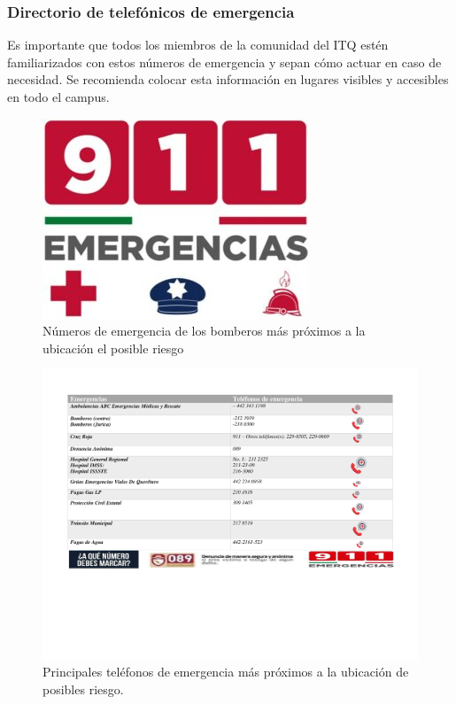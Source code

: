     \subsubsection{Directorio de telefónicos de emergencia}
    Es importante que todos los miembros de la comunidad del ITQ estén familiarizados con estos números de emergencia y sepan cómo actuar en caso de necesidad. Se recomienda colocar esta información en lugares visibles y accesibles en todo el campus.
    \begin{figure}[H]
        \centering
        \includegraphics[scale=0.70]{1/img/Emergencias.jpg}
        \caption{Números de emergencia de los bomberos más próximos a la ubicación el posible riesgo}
        \label{fig:Emergencias}
    \end{figure}
    \begin{figure}[H]
        \centering
        \includegraphics[trim = {20mm 20mm 10mm 10mm},clip,scale=0.30]{1/img/directorio.pdf}
        \caption{Principales teléfonos de emergencia más próximos a la ubicación de posibles riesgo.}
        \label{fig:directorio}
    \end{figure}
